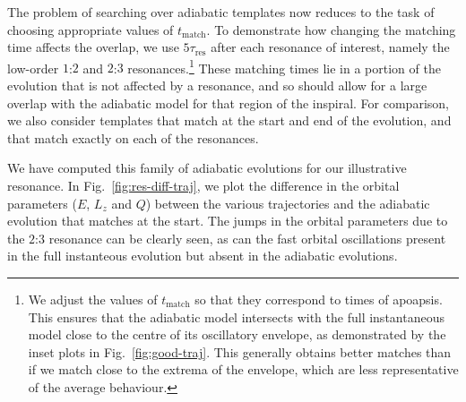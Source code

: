 \documentclass[aps,prd,amsfonts,amssymb,amsmath,nofootinbib,showpacs,superscriptaddress,twocolumn,floatfix]{revtex4-1}
\newcommand{\figref}[1]{Fig.~\ref{fig:#1}}
\newcommand{\sub}[1]{\ensuremath{_\mathrm{#1}}}
\begin{document}

The problem of searching over adiabatic templates now reduces to the task of choosing appropriate values of $t\sub{match}$. To demonstrate how changing the matching time affects the overlap, we use $5\tau\sub{res}$ after each resonance of interest, namely the low-order $1$:$2$ and $2$:$3$ resonances.\footnote{We adjust the values of $t\sub{match}$ so that they correspond to times of apoapsis. This ensures that the adiabatic model intersects with the full instantaneous model close to the centre of its oscillatory envelope, as demonstrated by the inset plots in \figref{good-traj}. This generally obtains better matches than if we match close to the extrema of the envelope, which are less representative of the average behaviour.} These matching times lie in a portion of the evolution that is not affected by a resonance, and so should allow for a large overlap with the adiabatic model for that region of the inspiral. For comparison, we also consider templates that match at the start and end of the evolution, and that match exactly on each of the resonances.


We have computed this family of adiabatic evolutions for our illustrative resonance. In \figref{res-diff-traj}, we plot the difference in the orbital parameters ($E$, $L_z$ and $Q$) between the various trajectories and the adiabatic evolution that matches at the start. The jumps in the orbital parameters due to the $2$:$3$ resonance can be clearly seen, as can the fast orbital oscillations present in the full instanteous evolution but absent in the adiabatic evolutions.
\end{document}
